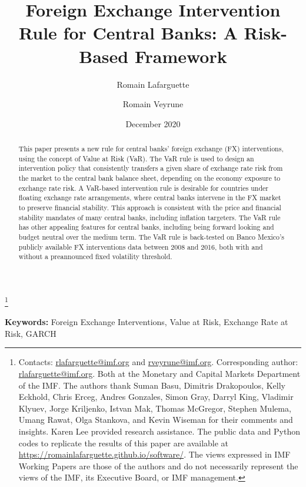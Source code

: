 \documentclass[11pt]{article}
\title{\textbf{Foreign Exchange Intervention Rule for Central Banks:
A Risk-Based Framework}}
\author{Romain Lafarguette}
\author{Romain Veyrune}
\affil{International Monetary Fund}
\date{December 2020}
\newcommand\blfootnote[1]{%
  \begingroup
  \renewcommand\thefootnote{}\footnote{#1}%
  \addtocounter{footnote}{-1}%
  \endgroup
}
\begin{document}
\maketitle      \blfootnote{Contacts:      \url{rlafarguette@imf.org}      and
\url{rveyrune@imf.org}. Corresponding author: \url{rlafarguette@imf.org}. Both
at the Monetary and Capital Markets  Department of the IMF.  The authors thank
Suman Basu, Dimitris Drakopoulos, Kelly Eckhold, Chris Erceg, Andres Gonzales,
Simon Gray, Darryl King, Vladimir  Klyuev, Jorge Kriljenko, Istvan Mak, Thomas
McGregor, Stephen  Mulema, Umang Rawat,  Olga Stankova, and Kevin  Wiseman for
their  comments and  insights.  Karen  Lee provided  research assistance.  The
public  data and  Python codes  to  replicate the  results of  this paper  are
available  at \url{https://romainlafarguette.github.io/software/}.   The views
expressed  in  IMF  Working  Papers  are  those of  the  authors  and  do  not
necessarily  represent the  views  of the  IMF, its  Executive  Board, or  IMF
management.}


\begin{abstract} This  paper presents  a new rule  for central  banks’ foreign
exchange (FX) interventions, using the concept of Value at Risk (VaR). The VaR
rule is  used to design an  intervention policy that consistently  transfers a
given share of exchange rate risk from  the market to the central bank balance
sheet, depending  on the economy exposure  to exchange rate risk.  A VaR-based
intervention  rule is  desirable for  countries under  floating exchange  rate
arrangements,  where central  banks intervene  in  the FX  market to  preserve
financial stability. This approach is  consistent with the price and financial
stability mandates of  many central banks, including  inflation targeters. The
VaR  rule has  other appealing  features  for central  banks, including  being
forward  looking and  budget neutral  over the  medium term.  The VaR  rule is
back-tested on Banco Mexico’s publicly available FX interventions data between
2008  and  2016,  both  with  and  without  a  preannounced  fixed  volatility
threshold.\\
\end{abstract}
\bigskip

\noindent \textbf{Keywords:} Foreign Exchange Interventions, Value at Risk, Exchange Rate at Risk, GARCH 
\end{document}

